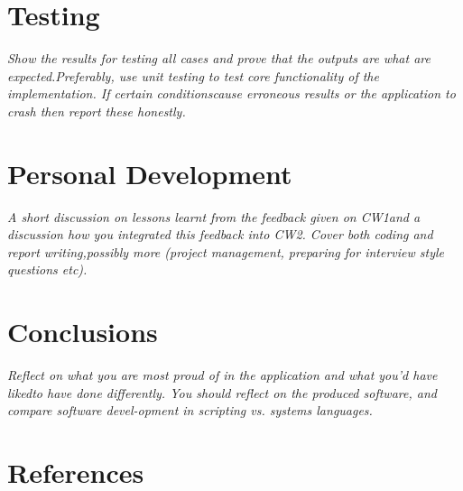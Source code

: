 \documentclass[11pt]{article}
\begin{document}
\section{Testing}
\emph{Show  the  results  for  testing  all  cases  and  prove  that  the  outputs  are  what  are  expected.Preferably,  use  unit  testing  to  test  core  functionality  of  the  implementation.   If  certain  conditionscause erroneous results or the application to crash then report these honestly.}

\section{Personal Development}
\emph{A short discussion on lessons learnt from the feedback given on CW1and a discussion how you integrated this feedback into CW2.  Cover both coding and report writing,possibly more (project management, preparing for interview style questions etc).}

\section{Conclusions}
\emph{Reflect on what you are most proud of in the application and what you’d have likedto have done differently.  You should reflect on the produced software, and compare software devel-opment in scripting vs.  systems languages.}

\pagebreak
\appendix
\section{References}
\printbibliography
\end{document}
